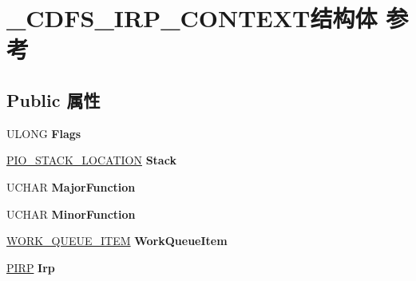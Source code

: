 \hypertarget{struct___c_d_f_s___i_r_p___c_o_n_t_e_x_t}{}\section{\+\_\+\+C\+D\+F\+S\+\_\+\+I\+R\+P\+\_\+\+C\+O\+N\+T\+E\+X\+T结构体 参考}
\label{struct___c_d_f_s___i_r_p___c_o_n_t_e_x_t}
\subsection*{Public 属性}
\begin{DoxyCompactItemize}
\item 
\mbox{\label{struct___c_d_f_s___i_r_p___c_o_n_t_e_x_t_a16c2d358405e9999849a20cd82c3161e}} 
U\+L\+O\+NG {\bfseries Flags}
\item 
\mbox{\label{struct___c_d_f_s___i_r_p___c_o_n_t_e_x_t_a75318898e4472db032deaf8f78fdedfd}} 
\hyperlink{struct___i_o___s_t_a_c_k___l_o_c_a_t_i_o_n}{P\+I\+O\+\_\+\+S\+T\+A\+C\+K\+\_\+\+L\+O\+C\+A\+T\+I\+ON} {\bfseries Stack}
\item 
\mbox{\label{struct___c_d_f_s___i_r_p___c_o_n_t_e_x_t_a1674540e15778b0b69072f058afc132d}} 
U\+C\+H\+AR {\bfseries Major\+Function}
\item 
\mbox{\label{struct___c_d_f_s___i_r_p___c_o_n_t_e_x_t_ac6e8d978afdb5b342452652e21951504}} 
U\+C\+H\+AR {\bfseries Minor\+Function}
\item 
\mbox{\label{struct___c_d_f_s___i_r_p___c_o_n_t_e_x_t_a92082d3bab8b40bfea926b7d692be0de}} 
\hyperlink{struct___w_o_r_k___q_u_e_u_e___i_t_e_m}{W\+O\+R\+K\+\_\+\+Q\+U\+E\+U\+E\+\_\+\+I\+T\+EM} {\bfseries Work\+Queue\+Item}
\item 
\mbox{\label{struct___c_d_f_s___i_r_p___c_o_n_t_e_x_t_a36c78be9790782ef1c02d10c11314eaf}} 
\hyperlink{interfacevoid}{P\+I\+RP} {\bfseries Irp}
\item 
\mbox{\label{struct___c_d_f_s___i_r_p___c_o_n_t_e_x_t_a54588437aab3253896ae9cb84ae37ad0}} 

\end{DoxyCompactItemize}
